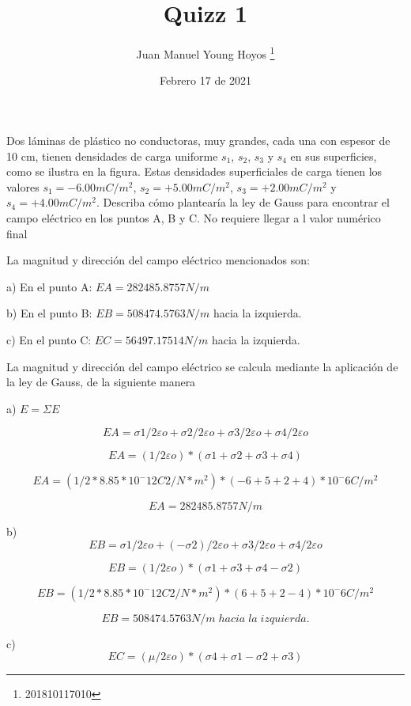 \documentclass[12pt, letterpaper, twoside]{article}
\title{Quizz 1}
\date{Febrero 17 de 2021}
\author{Juan Manuel Young Hoyos \thanks{201810117010}}
\begin{document}
    \maketitle

    \section{}

    Dos láminas de plástico no conductoras, muy grandes, cada una con espesor de 10 cm, 
    tienen densidades de carga uniforme $s_1$, $s_2$, $s_3$ y $s_4$ en sus superficies, como se ilustra en la figura. 
    Estas densidades superficiales de carga tienen los valores $s_1 = -6.00 mC/m^2$, $s_2 = +5.00 mC/m^2$, $s_3 = +2.00 mC/m^2$
    y $s_4 = +4.00 mC/m^2$. Describa cómo plantearía la ley de Gauss para encontrar el campo eléctrico en los puntos A, B y C.
    No requiere llegar a l valor numérico final

    La magnitud y dirección del campo eléctrico mencionados son:

    a) En el punto A:   $EA = 282485.8757 N/m$

    b) En el punto B:    $EB = 508474.5763 N/m$ hacia la izquierda.

    c) En el punto C:    $EC = 56497.17514 N/m$ hacia la izquierda.


   La magnitud y dirección del campo eléctrico se calcula mediante la aplicación de la ley de Gauss, de la siguiente manera

    a)    $E = \Sigma E$

        \[ EA = \sigma1/2\varepsilon o + \sigma2/2\varepsilon o + \sigma3 /2\varepsilon o + \sigma4/2\varepsilon o \]

        \[EA = (1/2\varepsilon o)* ( \sigma1 +\sigma2 +\sigma3+\sigma4) \]

        \[EA=  ( 1/2*8.85*10^-12 C2/N*m^2) * ( -6 + 5 + 2 + 4) *10^-6C/m^2 \]

        \[EA = 282485.8757 N/m \]


    b) \[ EB = \sigma1/2\varepsilon o +(- \sigma2)/2\varepsilon o + \sigma3 /2\varepsilon o + \sigma4/2\varepsilon o \]

        \[ EB = (1/2\varepsilon o)* ( \sigma1 +\sigma3 +\sigma4- \sigma2) \]

        \[ EB=  ( 1/2*8.85*10^-12 C2/N*m^2) * ( 6 + 5 + 2 - 4) *10^-6C/m^2 \]

        \[ EB =  508474.5763 N/m \;hacia\;la\;izquierda. \]


      c) \[ EC =( \mu/2\varepsilon o)* ( \sigma4+\sigma1 -\sigma2+\sigma3 ) \]
\end{document}

